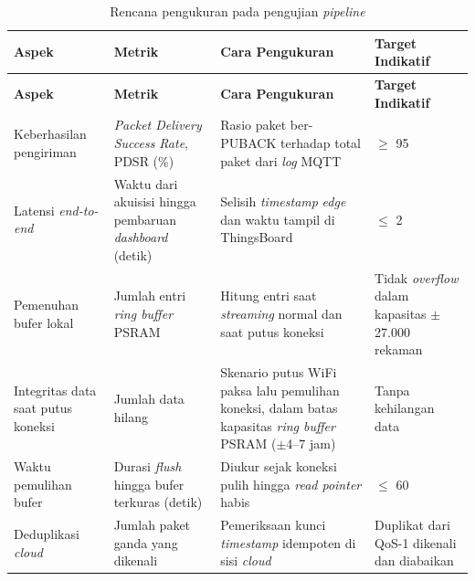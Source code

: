 \begin{center}
  \setlength{\tabcolsep}{4pt}
  \renewcommand{\arraystretch}{1.15}
  \small
  \begin{longtable}{>{\RaggedRight\arraybackslash}p{2.5cm}>{\RaggedRight\arraybackslash}p{3.2cm}>{\RaggedRight\arraybackslash}p{4.6cm}>{\RaggedRight\arraybackslash}p{2.5cm}}
    \caption{Rencana pengukuran pada pengujian \textit{pipeline}}
    \label{tab:pengujian-pipeline} \\
    \toprule
    \textbf{Aspek} & \textbf{Metrik} & \textbf{Cara Pengukuran} & \textbf{Target Indikatif} \\
    \midrule
    \endfirsthead
    \toprule
    \textbf{Aspek} & \textbf{Metrik} & \textbf{Cara Pengukuran} & \textbf{Target Indikatif} \\
    \midrule
    \endhead
    \bottomrule
    \endfoot
    Keberhasilan pengiriman &
    \textit{Packet Delivery Success Rate}, PDSR (\%) &
    Rasio paket ber-PUBACK terhadap total paket dari \textit{log} MQTT &
    $\geq$ 95 \\
    Latensi \textit{end-to-end} &
    Waktu dari akuisisi hingga pembaruan \textit{dashboard} (detik) &
    Selisih \textit{timestamp} \textit{edge} dan waktu tampil di ThingsBoard &
    $\leq$ 2 \\
    Pemenuhan bufer lokal &
    Jumlah entri \textit{ring buffer} PSRAM &
    Hitung entri saat \textit{streaming} normal dan saat putus koneksi &
    Tidak \textit{overflow} dalam kapasitas $\pm$27.000 rekaman \\
    Integritas data saat putus koneksi &
    Jumlah data hilang &
    Skenario putus WiFi paksa lalu pemulihan koneksi, dalam batas
    kapasitas \textit{ring buffer} PSRAM ($\pm$4--7 jam) &
    Tanpa kehilangan data \\
    Waktu pemulihan bufer &
    Durasi \textit{flush} hingga bufer terkuras (detik) &
    Diukur sejak koneksi pulih hingga \textit{read pointer} habis &
    $\leq$ 60 \\
    Deduplikasi \textit{cloud} &
    Jumlah paket ganda yang dikenali &
    Pemeriksaan kunci \textit{timestamp} idempoten di sisi \textit{cloud} &
    Duplikat dari QoS-1 dikenali dan diabaikan \\
  \end{longtable}
  \par\vspace{2pt}{\footnotesize\raggedright Keterangan: satuan target mengikuti satuan pada kolom Metrik. Skenario kehilangan daya perangkat berada di luar cakupan pengujian ini.\par}
\end{center}

